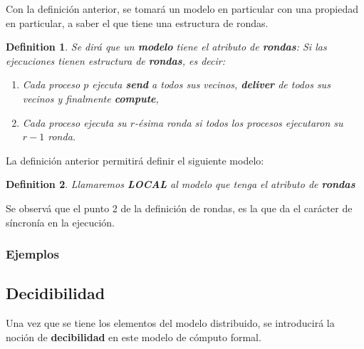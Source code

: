 \documentclass[10pt]{report}
\newtheorem{definition}{Definition}
\begin{document}
    Con la definición anterior, se tomará un modelo en particular con una propiedad en particular, a saber el que
    tiene una estructura de rondas.\newline
    \begin{definition}
        Se dirá que un \textbf{modelo} tiene el atributo de \textbf{rondas}:
        Si las ejecuciones tienen estructura de \textbf{rondas}, es decir:
        \begin{enumerate}
            \item Cada proceso $p$ ejecuta \textbf{send} a todos sus vecinos, \textbf{deliver} de todos sus vecinos y finalmente \textbf{compute},
            \item Cada proceso ejecuta su $r$-ésima ronda si todos los procesos ejecutaron su $r-1$ ronda.
        \end{enumerate}
    \end{definition}\newline
    La definición anterior permitirá definir el siguiente modelo:
    \begin{definition}
        Llamaremos \textbf{LOCAL} al modelo que tenga el atributo de \textbf{rondas}
    \end{definition}
    Se observá que el punto 2 de la definición de rondas, es la que da el carácter de
    síncronía en la ejecución.
    \subsubsection{Ejemplos}


    \newpage
    \subsection{Decidibilidad}\label{subsec:decidibilidad}
    Una vez que se tiene los elementos del modelo distribuido, se introducirá la noción de \textbf{decibilidad} en
    este modelo de cómputo formal.
\end{document}
